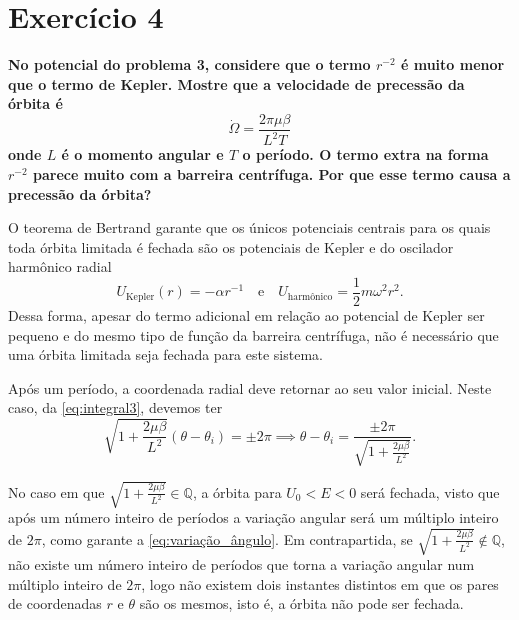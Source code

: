 \section*{Exercício 4}
\textbf{No potencial do problema 3, considere que o termo \(r^{-2}\) é muito menor que o termo de Kepler. Mostre que a velocidade de precessão da órbita é}
\begin{equation*}
    \dot\Omega = \frac{2\pi\mu\beta}{L^2T}
\end{equation*}
\textbf{onde \(L\) é o momento angular e \(T\) o período. O termo extra na forma \(r^{-2}\) parece muito com a barreira centrífuga. Por que esse termo causa a precessão da órbita?}

O teorema de Bertrand garante que os únicos potenciais centrais para os quais toda órbita limitada é fechada são os potenciais de Kepler e do oscilador harmônico radial
\begin{equation}
    U_{\mathrm{Kepler}}(r) = -\alpha r^{-1}\quad\text{e}\quad U_{\text{harmônico}} = \frac12m\omega^2r^2.
\end{equation}
Dessa forma, apesar do termo adicional em relação ao potencial de Kepler ser pequeno e do mesmo tipo de função da barreira centrífuga, não é necessário que uma órbita limitada seja fechada para este sistema.

Após um período, a coordenada radial deve retornar ao seu valor inicial. Neste caso, da \cref{eq:integral3}, devemos ter
\begin{equation}
    \sqrt{1 + \frac{2\mu\beta}{L^2}}\left(\theta - \theta_i\right) = \pm2\pi \implies \theta - \theta_i = \frac{\pm 2\pi}{\sqrt{1 + \frac{2\mu\beta}{L^2}}}.\label{eq:variação_ângulo}
\end{equation}

No caso em que \(\sqrt{1 + \frac{2\mu\beta}{L^2}} \in \mathbb{Q}\), a órbita para \(U_0 < E < 0\) será fechada, visto que após um número inteiro de períodos a variação angular será um múltiplo inteiro de \(2\pi\), como garante a \cref{eq:variação_ângulo}. Em contrapartida, se \(\sqrt{1 + \frac{2\mu\beta}{L^2}}\notin \mathbb{Q}\), não existe um número inteiro de períodos que torna a variação angular num múltiplo inteiro de \(2\pi\), logo não existem dois instantes distintos em que os pares de coordenadas \(r\) e \(\theta\) são os mesmos, isto é, a órbita não pode ser fechada.

